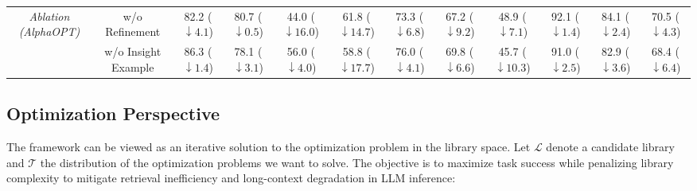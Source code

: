\documentclass[sigconf, nonacm]{acmart}
\begin{document}
\begin{table}[t]
\begin{tabular}{c c c c c c c c c c c c}
\multirow{3}{*}{\emph{Ablation (AlphaOPT)}}
& w/o Refinement 
& \makecell{82.2 \\ {\footnotesize($\downarrow 4.1$)}}
& \makecell{80.7 \\ {\footnotesize($\downarrow 0.5$)}}
& \makecell{44.0 \\ {\footnotesize($\downarrow 16.0$)}}
& \makecell{61.8 \\ {\footnotesize($\downarrow 14.7$)}}
& \makecell{73.3 \\ {\footnotesize($\downarrow 6.8$)}}
& \makecell{67.2 \\ {\footnotesize($\downarrow 9.2$)}}
& \makecell{48.9 \\ {\footnotesize($\downarrow 7.1$)}}
& \makecell{92.1 \\ {\footnotesize($\downarrow 1.4$)}}
& \makecell{84.1 \\ {\footnotesize($\downarrow 2.4$)}}
& \makecell{70.5 \\ {\footnotesize($\downarrow 4.3$)}} \\

& w/o Insight Example 
& \makecell{86.3 \\ {\footnotesize($\downarrow 1.4$)}}
& \makecell{78.1 \\ {\footnotesize($\downarrow 3.1$)}}
& \makecell{56.0 \\ {\footnotesize($\downarrow 4.0$)}}
& \makecell{58.8 \\ {\footnotesize($\downarrow 17.7$)}}
& \makecell{76.0 \\ {\footnotesize($\downarrow 4.1$)}}
& \makecell{69.8 \\ {\footnotesize($\downarrow 6.6$)}}
& \makecell{45.7 \\ {\footnotesize($\downarrow 10.3$)}}
& \makecell{91.0 \\ {\footnotesize($\downarrow 2.5$)}}
& \makecell{82.9 \\ {\footnotesize($\downarrow 3.6$)}}
& \makecell{68.4 \\ {\footnotesize($\downarrow 6.4$)}} \\

\bottomrule
\end{tabular}
\end{table}


\subsection{Optimization Perspective\label{sec:method:theory}}
The framework can be viewed as an iterative solution to the optimization problem in the library space. Let $\mathcal{L}$ denote a candidate library and $\mathcal{T}$ the distribution of the optimization problems we want to solve. The objective is to maximize task success while penalizing library complexity to mitigate retrieval inefficiency and long-context degradation in LLM inference:
\end{document}
